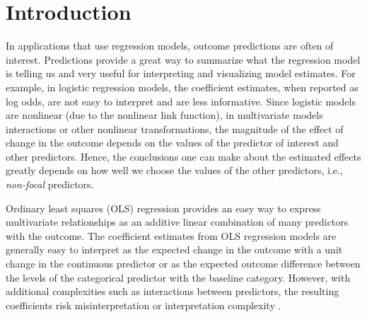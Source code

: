 
\linenumbers


\section{Introduction}



In applications that use regression models, outcome predictions are often of interest. Predictions provide a great way to summarize what the regression model is telling us and very useful for interpreting and visualizing model estimates. For example, in logistic regression models, the coefficient estimates, when reported as log odds, are not easy to interpret and are less informative. Since logistic models are nonlinear (due to the nonlinear link function), in multivariate models interactions or other nonlinear transformations, the magnitude of the effect of change in the outcome depends on the values of the predictor of interest and other predictors. Hence, the conclusions one can make about the estimated effects greatly depends on how well we choose the values of the other predictors, i.e., \emph{non-focal} predictors.  

Ordinary least squares (OLS) regression provides an easy way to express multivariate relationships as an additive linear combination of many predictors with the outcome. The coefficient estimates from OLS regression models are generally easy to interpret as the expected change in the outcome with a unit change in the continuous predictor or as the expected outcome difference between the levels of the categorical predictor with the baseline category. However, with additional complexities such as interactions between predictors, the resulting coefficients risk misinterpretation or interpretation complexity \citep{brambor_understanding_2006, berry_improving_2012}. 


